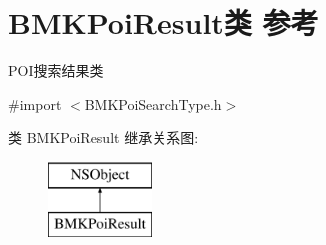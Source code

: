 \hypertarget{interface_b_m_k_poi_result}{\section{B\+M\+K\+Poi\+Result类 参考}
\label{interface_b_m_k_poi_result}
}


P\+O\+I搜索结果类  




{\ttfamily \#import $<$B\+M\+K\+Poi\+Search\+Type.\+h$>$}

类 B\+M\+K\+Poi\+Result 继承关系图\+:\begin{figure}[H]
\begin{center}
\leavevmode
\includegraphics[height=2.000000cm]{interface_b_m_k_poi_result}
\end{center}
\end{figure}

